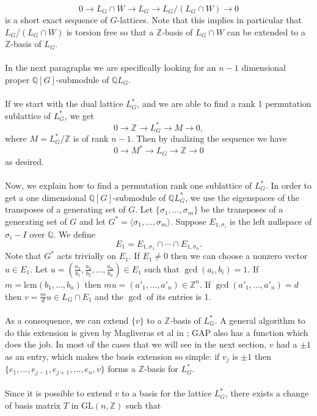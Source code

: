 \documentclass{article}
\theoremstyle{plain}
\theoremstyle{definition}
\newcommand{\Z}{\ensuremath{\mathbb{Z}}}
\newcommand{\Q}{\ensuremath{\mathbb{Q}}}
\begin{document}
$$0 \rightarrow L_G \cap W  \rightarrow L_G \rightarrow L_G/(L_G \cap W) \rightarrow 0$$
 is a short exact sequence of $G$-lattices. Note that this implies in particular that $L_G/(L_G \cap W)$ 
 is torsion free so that a $\Z$-basis of $L_G \cap W$ can be extended to a $\Z$-basis of $L_G$.\\
\\
In the next paragraphs we are specifically looking for an $n-1$ dimensional proper 
$\Q[G]$-submodule of $\Q L_G$.\\
\\
If we start with the dual lattice $L^*_G$, and we are able to find a rank 1 permutation 
sublattice of $L^*_G$, we get $$0 \rightarrow \Z  \rightarrow L^*_G \rightarrow M \rightarrow 0,$$ 
where $M = L^*_G/\Z$ is of rank $n-1$. Then by dualizing the sequence we have 
$$0 \rightarrow M^*  \rightarrow L_G \rightarrow \Z \rightarrow 0$$ as desired.
 \\
\\
Now, we explain how to find a permutation rank one sublattice of $L^*_G$. In order 
to get a one dimensional $\Q[G]$-submodule of $\Q L^*_G$, we use the eigenspaces of 
the transposes of a generating set of $G$. Let  $\lbrace \sigma_1, \ldots, \sigma_m\rbrace$ 
be the transposes of a generating set of $G$ and let  $G^* = \langle \sigma_1, \ldots, \sigma_m\rangle$. 
Suppose $E_{1,\sigma_i}$ is the left nullspace of $\sigma_i-I$ over $\Q$. 
We define $$E_1 = E_{1,\sigma_1}\cap \cdots \cap E_{1,\sigma_n}. $$
Note that $G^*$ acts trivially on $E_1$. If $E_1\neq {0}$ then we can choose a 
nonzero vector $u \in E_1$. Let $u = (\frac{a_1}{b_1}, \frac{a_2}{b_2}, \ldots , \frac{a_n}{b_n})\in E_1$ 
such that $\gcd(a_i, b_i) = 1$. If $m = \mathrm{lcm}(b_1, \ldots, b_n)$ then 
$m u = (a'_1, \ldots, a'_n) \in\Z^n$. If $\gcd (a'_1, \ldots, a'_n) = d$ then 
$v =\frac{m}{d} u \in L_G \cap E_1$ and the $\gcd$ of its entries is 1. \\
\\
As a consequence, we can extend $\lbrace v \rbrace$ to a $\Z$-basis of $L^*_G$. 
A general algorithm to do this extension is given by Magliveras et al in 
\cite{LatticeBase}; GAP also has a function which does the job. In most of the 
cases that we will see in the next section, $v$ had a $\pm 1$ as an entry, which makes 
the basis extension so simple: if $v_j$ is $\pm 1$ then 
$\lbrace e_1, \ldots , e_{j-1}, e_{j+1}, \ldots, e_n , v \rbrace$ forms a $\Z$-basis for $L^*_G$.\\
\\  
Since it is possible to extend $v$ to a basis for the lattice $L^*_G$, there exists a change of basis matrix $T$ in $\mathrm{GL}(n,\Z)$ such that
\end{document}
